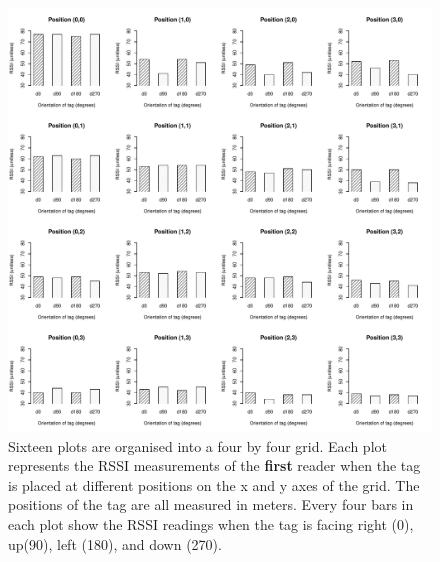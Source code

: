 \begin{figure}
	\begin{center}
		\includegraphics[width=1\textwidth]{figures/rssi_distance_grid_r1}
		\caption{Sixteen plots are organised into a four by four grid. Each plot represents the RSSI measurements of the \textbf{first} reader when the tag is placed at different positions on the x and y axes of the grid. The positions of the tag are all measured in meters. Every four bars in each plot show the RSSI readings when the tag is facing right (0\textdegree), up(90\textdegree), left (180\textdegree), and down (270\textdegree).}
	\end{center}
\end{figure}
